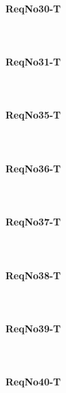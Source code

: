\paragraph{ReqNo30-T}\mbox{}\\ %


\paragraph{ReqNo31-T}\mbox{}\\ %

\paragraph{ReqNo35-T}\mbox{}\\ %


\paragraph{ReqNo36-T}\mbox{}\\ %


\paragraph{ReqNo37-T}\mbox{}\\ %


\paragraph{ReqNo38-T}\mbox{}\\ %

\paragraph{ReqNo39-T}\mbox{}\\ %

\paragraph{ReqNo40-T}\mbox{}\\ %